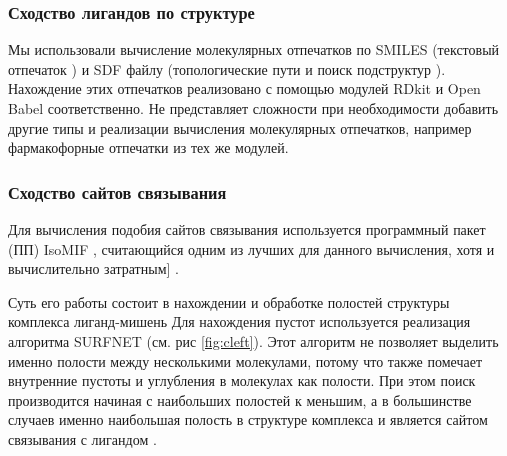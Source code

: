 \documentclass[a4paper,14pt]{article}         %
\begin{document}
\subsubsection{Сходство лигандов по структуре}
Мы использовали вычисление молекулярных отпечатков по SMILES (текстовый отпечаток \cite{Weininger1989}) и SDF файлу (топологические пути и поиск подструктур \cite{Cereto-Massague2015}). Нахождение этих отпечатков реализовано с помощью модулей RDkit \cite{rdkit} и Open Babel \cite{openbabel} соответственно. Не представляет сложности при необходимости добавить другие типы и реализации вычисления молекулярных отпечатков, например фармакофорные отпечатки из тех же модулей.

\subsubsection{Сходство сайтов связывания}

Для вычисления подобия сайтов связывания используется программный пакет (ПП) IsoMIF \cite{isomif, Chartier2015}, считающийся одним из лучших для данного вычисления, хотя и вычислительно затратным] \cite{Ehrt2016}.

Суть его работы состоит в нахождении и обработке полостей структуры комплекса лиганд-мишень\cite{Gaudreault2015} Для нахождения пустот используется реализация алгоритма SURFNET \cite{Laskowski1995} (см. рис \ref{fig:cleft}). Этот алгоритм не позволяет выделить именно полости между несколькими молекулами, потому что также помечает внутренние пустоты и углубления в молекулах как полости. При этом поиск производится начиная с наибольших полостей к меньшим, а в большинстве случаев именно наибольшая полость в структуре комплекса и является сайтом связывания с лигандом \cite{Laskowski1995}. 
\end{document}
